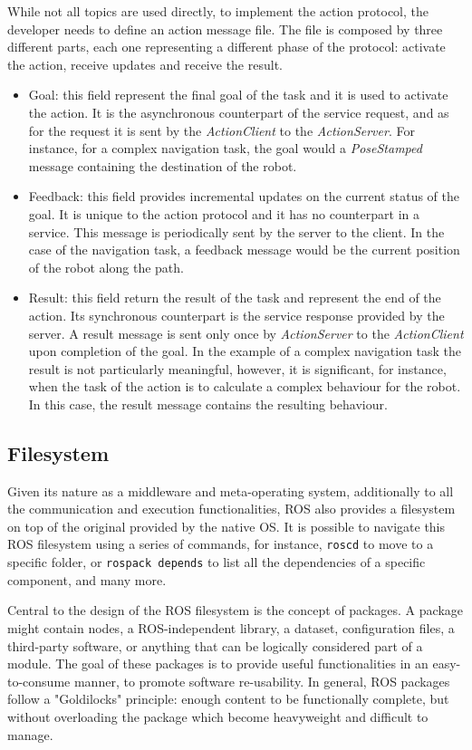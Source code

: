 While not all topics are used directly, to implement the action protocol, the developer needs to define an action message file. The file is composed by three different parts, each one representing a different phase of the protocol: activate the action, receive updates and receive the result. 
\begin{itemize}
\item Goal: this field represent the final goal of the task and it is used to activate the action. It is the asynchronous counterpart of the service request, and as for the request it is sent by the \textit{ActionClient} to the \textit{ActionServer}. For instance, for a complex navigation task, the goal would a \textit{PoseStamped} message containing the destination of the robot.
\item Feedback: this field provides incremental updates on the current status of the goal. It is unique to the action protocol and it has no counterpart in a service. This message is periodically sent by the server to the client. In the case of the navigation task, a feedback message would be the current position of the robot along the path.
\item Result: this field return the result of the task and represent the end of the action. Its synchronous counterpart is the service response provided by the server. A result message is sent only once by \textit{ActionServer} to the \textit{ActionClient} upon completion of the goal. In the example of a complex navigation task the result is not particularly meaningful, however, it is significant, for instance, when the task of the action is to calculate a complex behaviour for the robot. In this case, the result message contains the resulting behaviour.
\end{itemize}

\subsection{Filesystem}
Given its nature as a middleware and meta-operating system, additionally to all the communication and execution functionalities, ROS also provides a filesystem on top of the original provided by the native OS. It is possible to navigate this ROS filesystem using a series of commands, for instance, \texttt{roscd} to move to a specific folder, or \texttt{rospack depends} to list all the dependencies of a specific component, and many more.

Central to the design of the ROS filesystem is the concept of packages. A package might contain nodes, a ROS-independent library, a dataset, configuration files, a third-party software, or anything that can be logically considered part of a module. The goal of these packages is to provide useful functionalities in an easy-to-consume manner, to promote software re-usability. In general, ROS packages follow a "Goldilocks" principle: enough content to be functionally complete, but without overloading the package which become heavyweight and difficult to manage.

